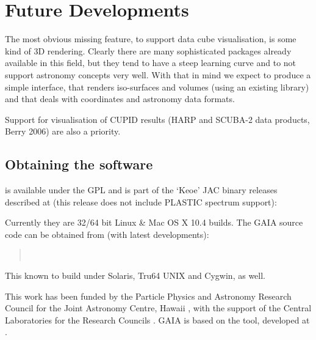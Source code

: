\documentclass[11pt,twoside]{article}  %
\begin{document}
%

\section{Future Developments}

The most obvious missing feature, to support data cube visualisation, is some
kind of 3D rendering. Clearly there are many sophisticated packages already
available in this field, but they tend to have a steep learning curve and to
not support astronomy concepts very well. With that in mind we expect to
produce a simple interface, that renders iso-surfaces and volumes (using an
existing library) and that deals with coordinates and astronomy data formats.

Support for visualisation of CUPID results (HARP and SCUBA-2 data products,
Berry 2006) are also a priority.

\subsection{Obtaining the software}

is available under the GPL and is part of the `Keoe' JAC binary releases
described at (this release does not include PLASTIC spectrum support):
\begin{quote}
\end{quote}
Currently they are 32/64 bit Linux \& Mac OS X 10.4 builds.
The GAIA source code can be obtained from (with latest developments):
\begin{quote}
 \\
\end{quote}
This known to build under Solaris, Tru64 UNIX and Cygwin, as well.

\acknowledgments

This work has been funded by the Particle Physics and Astronomy Research
Council 
for the Joint Astronomy Centre, Hawaii 
, 
with the support
of the Central Laboratories for the Research Councils 
. 
GAIA is based on the 
tool, developed at 
.
\end{document}

